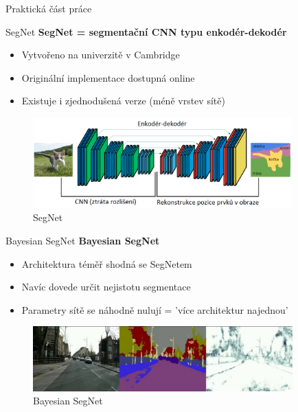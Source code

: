 \documentclass[aspectratio=1610]{beamer}
\begin{document}
\begin{frame}{}
\centering
{\Large Praktická část práce}	
\end{frame}
\begin{frame}{SegNet}
\textbf{SegNet = segmentační CNN typu enkodér-dekodér}
\begin{itemize}
	\item Vytvořeno na univerzitě v Cambridge
	\item Originální implementace dostupná online	
	\item Existuje i zjednodušená verze (méně vrstev sítě)
\end{itemize}
\begin{figure}[h]
	\begin{center}
		\includegraphics[width=10cm, keepaspectratio]{segnet.png}
	\end{center}
	\caption{SegNet} 	
\end{figure}
\end{frame}
\begin{frame}{Bayesian SegNet}
\textbf{Bayesian SegNet}
\begin{itemize}
	\item Architektura téměř shodná se SegNetem 
	\item Navíc dovede určit nejistotu segmentace
	\item Parametry sítě se náhodně nulují = 'více architektur najednou'
\end{itemize}
\vspace{5mm}
\begin{figure}[h]
	\begin{center}
		\includegraphics[width=10cm, keepaspectratio]{bayesian.jpg}
	\end{center}
	\caption{Bayesian SegNet} 	
\end{figure}
\end{frame}
\end{document}
